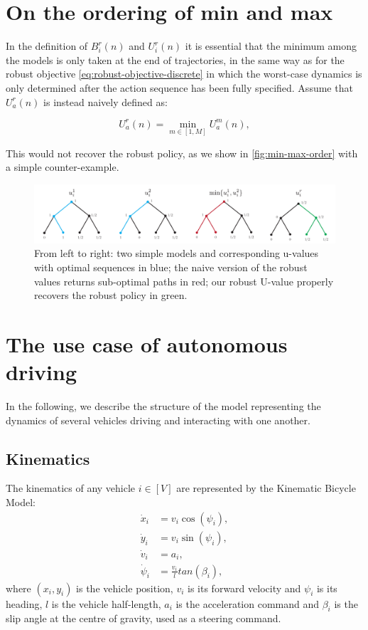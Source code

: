 \documentclass{article}
\begin{document}
\section{On the ordering of min and max}
	\label{sec:min-max-order}

	In the definition of $B_{i}^{r}(n)$ and $U_{i}^{r}(n)$ it is essential that the minimum among the models is only taken at the end of trajectories, in the same way as for the robust objective \eqref{eq:robust-objective-discrete} in which the worst-case dynamics is only determined after the action sequence has been fully specified. Assume that $U_{a}^{r}(n)$ is instead naively defined as:
	
	\[
	U_{a}^{r}(n)=\min_{m\in[1,M]}U_{a}^{m}(n),
	\]
	
	This would not recover the robust policy, as we show in \autoref{fig:min-max-order} with a simple counter-example.
	\begin{figure}[htp]
		\centering
		\includegraphics[width=\linewidth]{img/min-max-order}
		\caption{From left to right: two simple models and corresponding u-values with optimal sequences in blue; the naive version of the robust values returns sub-optimal paths in red; our robust U-value properly recovers the robust policy in green.}
		\label{fig:min-max-order}
	\end{figure}

\section{The use case of autonomous driving}

In the following, we describe the structure of the model representing the dynamics of several vehicles driving and interacting with one another.

\subsection{Kinematics}

The kinematics of any vehicle $i\in[V]$ are represented by the Kinematic Bicycle Model:
\begin{align}
	\dot{x}_i &= v_i\cos(\psi_i), \nonumber\\
	\dot{y}_i &= v_i\sin(\psi_i), \nonumber\\
	\dot{v}_i &= a_i, \nonumber\\
	\dot{\psi}_i &= \frac{v_i}{l}tan(\beta_i), \nonumber
\end{align}
where $(x_i, y_i)$ is the vehicle position, $v_i$ is its forward velocity and $\psi_i$ is its heading, $l$ is the vehicle half-length, $a_i$ is the acceleration command and $\beta_i$ is the slip angle at the centre of gravity, used as a steering command.
\end{document}
